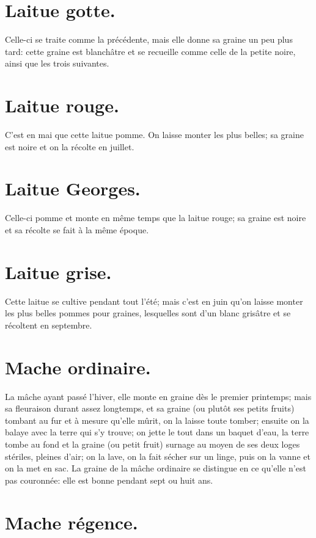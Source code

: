 \documentclass[10pt,a4paper]{book}
\begin{document}
\section{Laitue gotte.}

Celle-ci se traite comme la précédente, mais elle donne sa graine un peu plus tard: cette graine est blanchâtre et se recueille comme celle de la petite noire, ainsi que les trois suivantes.

\section{Laitue rouge.}

C'est en mai que cette laitue pomme. On laisse monter les plus belles; sa graine est noire et on la récolte en juillet.

\section{Laitue Georges.}

Celle-ci pomme et monte en même temps que la laitue rouge; sa graine est noire et sa récolte se fait à la même époque.

\section{Laitue grise.}

Cette laitue se cultive pendant tout l'été; mais c'est en juin qu'on laisse monter les plus belles pommes pour graines, lesquelles sont d'un blanc grisâtre et se récoltent en septembre.

\section{Mache ordinaire.}

La mâche ayant passé l'hiver, elle monte en graine dès le premier printemps; mais sa fleuraison durant assez longtemps, et sa graine (ou plutôt ses petits fruits) tombant au fur et à mesure qu'elle mûrit, on la laisse toute tomber; ensuite on la balaye avec la terre qui s'y trouve; on jette le tout dans un baquet d'eau, la terre tombe au fond et la graine (ou petit fruit) surnage au moyen de ses deux loges stériles, pleines d'air; on la lave, on la fait sécher sur un linge, puis on la vanne et on la met en sac. La graine de la mâche ordinaire se distingue en ce qu'elle n'est pas couronnée: elle est bonne pendant sept ou huit ans.

\section{Mache régence.}
\end{document}
